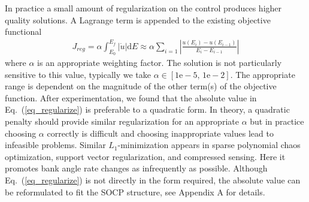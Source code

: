 \documentclass[letterpaper, preprint, paper,11pt]{AAS}	%
\begin{document}
	In practice a small amount of regularization on the control produces higher quality solutions. A Lagrange term is appended to the existing objective functional  
	\begin{align}
	J_{reg} = \alpha\int_{E_0}^{E_f} | \dot{u} | \mathrm{d}E\approx \alpha\sum_{i=1} \left|\frac{u(E_i) - u(E_{i-1})}{E_i - E_{i-1}}\right|  \label{eq_regularize} 
	\end{align}
	where $\alpha$ is an appropriate weighting factor. The solution is not particularly sensitive to this value, typically we take $\alpha\in[1\mathrm{e}-5,\,1\mathrm{e}-2]$. The appropriate range is dependent on the magnitude of the other term(s) of the objective function. After experimentation, we found that the absolute value in Eq.~(\ref{eq_regularize}) is preferable to a quadratic form. In theory, a quadratic penalty should provide similar regularization for an appropriate $\alpha$ but in practice choosing $\alpha$ correctly is difficult and choosing inappropriate values lead to infeasible problems. Similar $ L_1 $-minimization appears in sparse polynomial chaos optimization\cite{SparsePCE}, support vector regularization,\cite{SVM} and compressed sensing.\cite{CompressedSensing} Here it promotes bank angle rate changes as infrequently as possible. Although Eq.~(\ref{eq_regularize}) is not directly in the form required, the absolute value can be reformulated to fit the SOCP structure, see Appendix A for details.  %
	
	
	
\end{document}
